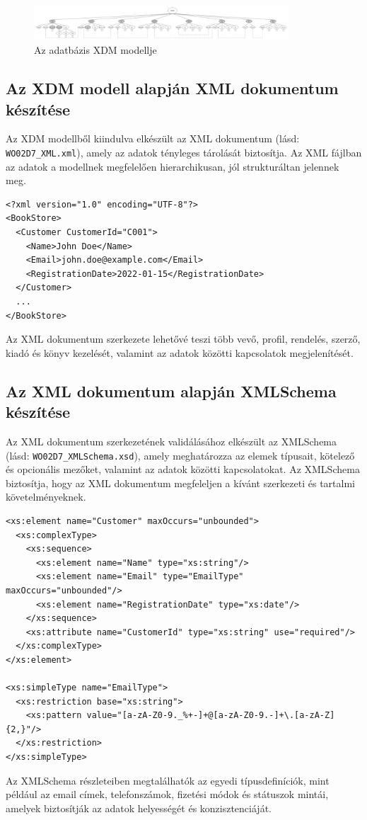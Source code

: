 \documentclass{article}
\begin{document}
    \begin{figure}[h!]
      \centering
      \includegraphics[width=0.85\textwidth]{WO02D7_XDM.jpg}
      \caption{Az adatbázis XDM modellje}
    \end{figure}

  \newpage
  \subsection{Az XDM modell alapján XML dokumentum készítése}
    Az XDM modellből kiindulva elkészült az XML dokumentum (lásd: \texttt{WO02D7\_XML.xml}), amely az adatok tényleges tárolását biztosítja. Az XML fájlban az adatok a modellnek megfelelően hierarchikusan, jól strukturáltan jelennek meg.

    \begin{verbatim}
<?xml version="1.0" encoding="UTF-8"?>
<BookStore>
  <Customer CustomerId="C001">
    <Name>John Doe</Name>
    <Email>john.doe@example.com</Email>
    <RegistrationDate>2022-01-15</RegistrationDate>
  </Customer>
  ...
</BookStore>
    \end{verbatim}

    Az XML dokumentum szerkezete lehetővé teszi több vevő, profil, rendelés, szerző, kiadó és könyv kezelését, valamint az adatok közötti kapcsolatok megjelenítését.

  \subsection{Az XML dokumentum alapján XMLSchema készítése}
        Az XML dokumentum szerkezetének validálásához elkészült az XMLSchema (lásd: \texttt{WO02D7\_XMLSchema.xsd}), amely meghatározza az elemek típusait, kötelező és opcionális mezőket, valamint az adatok közötti kapcsolatokat. Az XMLSchema biztosítja, hogy az XML dokumentum megfeleljen a kívánt szerkezeti és tartalmi követelményeknek.

        \begin{verbatim}
<xs:element name="Customer" maxOccurs="unbounded">
  <xs:complexType>
    <xs:sequence>
      <xs:element name="Name" type="xs:string"/>
      <xs:element name="Email" type="EmailType" maxOccurs="unbounded"/>
      <xs:element name="RegistrationDate" type="xs:date"/>
    </xs:sequence>
    <xs:attribute name="CustomerId" type="xs:string" use="required"/>
  </xs:complexType>
</xs:element>

<xs:simpleType name="EmailType">
  <xs:restriction base="xs:string">
    <xs:pattern value="[a-zA-Z0-9._%+-]+@[a-zA-Z0-9.-]+\.[a-zA-Z]{2,}"/>
  </xs:restriction>
</xs:simpleType>
        \end{verbatim}

        Az XMLSchema részleteiben megtalálhatók az egyedi típusdefiníciók, mint például az email címek, telefonszámok, fizetési módok és státuszok mintái, amelyek biztosítják az adatok helyességét és konzisztenciáját.
\end{document}
